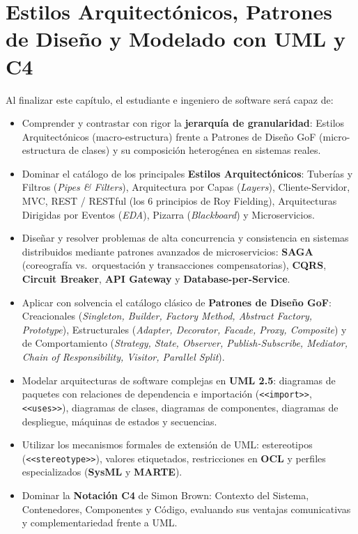 \chapter{Estilos Arquitectónicos, Patrones de Diseño y Modelado con UML y C4}
\label{cap:tema2}

\begin{tcolorbox}[
  enhanced,
  colback=primary!5!bglight,
  colframe=primary,
  arc=3mm,
  boxrule=1pt,
  title={\bfseries\color{white} Objetivos de Aprendizaje del Tema 2},
  coltitle=white
]
Al finalizar este capítulo, el estudiante e ingeniero de software será capaz de:
\begin{itemize}[leftmargin=1.5em]
  \item Comprender y contrastar con rigor la \textbf{jerarquía de granularidad}: Estilos Arquitectónicos (macro-estructura) frente a Patrones de Diseño GoF (micro-estructura de clases) y su composición heterogénea en sistemas reales.
  \item Dominar el catálogo de los principales \textbf{Estilos Arquitectónicos}: Tuberías y Filtros (\emph{Pipes \& Filters}), Arquitectura por Capas (\emph{Layers}), Cliente-Servidor, MVC, REST / RESTful (los 6 principios de Roy Fielding), Arquitecturas Dirigidas por Eventos (\emph{EDA}), Pizarra (\emph{Blackboard}) y Microservicios.
  \item Diseñar y resolver problemas de alta concurrencia y consistencia en sistemas distribuidos mediante patrones avanzados de microservicios: \textbf{SAGA} (coreografía vs.\ orquestación y transacciones compensatorias), \textbf{CQRS}, \textbf{Circuit Breaker}, \textbf{API Gateway} y \textbf{Database-per-Service}.
  \item Aplicar con solvencia el catálogo clásico de \textbf{Patrones de Diseño GoF}: Creacionales (\emph{Singleton, Builder, Factory Method, Abstract Factory, Prototype}), Estructurales (\emph{Adapter, Decorator, Facade, Proxy, Composite}) y de Comportamiento (\emph{Strategy, State, Observer, Publish-Subscribe, Mediator, Chain of Responsibility, Visitor, Parallel Split}).
  \item Modelar arquitecturas de software complejas en \textbf{UML 2.5}: diagramas de paquetes con relaciones de dependencia e importación (\texttt{<<import>>}, \texttt{<<uses>>}), diagramas de clases, diagramas de componentes, diagramas de despliegue, máquinas de estados y secuencias.
  \item Utilizar los mecanismos formales de extensión de UML: estereotipos (\texttt{<<stereotype>>}), valores etiquetados, restricciones en \textbf{OCL} y perfiles especializados (\textbf{SysML} y \textbf{MARTE}).
  \item Dominar la \textbf{Notación C4} de Simon Brown: Contexto del Sistema, Contenedores, Componentes y Código, evaluando sus ventajas comunicativas y complementariedad frente a UML.
\end{itemize}
\end{tcolorbox}

